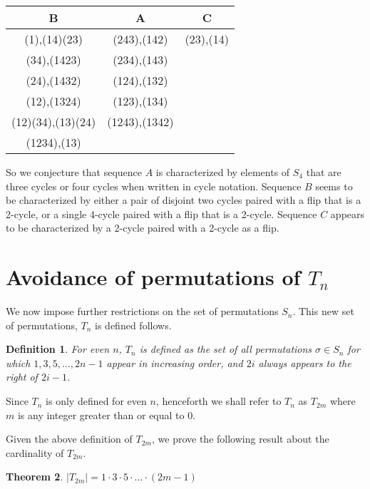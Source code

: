 \documentclass[11pt,letterpaper,twoside,english]{article}
\theoremstyle{theorem}
\newtheorem{theorem}{Theorem}
\newtheorem{definition}[theorem]{Definition}
\theoremstyle{remark}
\begin{document}
\begin{center}
\begin{tabular}{|c|c|c|}
B &A&C\\
\hline
(1),(14)(23)&(243),(142)&(23),(14)\\
(34),(1423)&(234),(143)&\\
(24),(1432)&(124),(132)&\\
(12),(1324)&(123),(134)&\\
(12)(34),(13)(24)&(1243),(1342)&\\
(1234),(13)&&\\
\end{tabular}
\end{center}

So we conjecture that sequence $A$ is characterized by elements of $S_4$ that are three cycles or four cycles when written in cycle notation. Sequence $B$ seems to be characterized by either a pair of disjoint two cycles paired with a flip that is a 2-cycle, or a single 4-cycle paired with a flip that is a 2-cycle. Sequence $C$ appears to be characterized by a 2-cycle paired with a 2-cycle as a flip. 


\section{Avoidance of permutations of $T_n$}
\label{Tn}
We now impose further restrictions on the set of permutations $S_n$. This new set of permutations, $T_n$ is defined follows.

\begin{definition}
For even $n$, $T_n$ is defined as the set of all permutations $\sigma \in S_n$ for which $1,3,5,\ldots,2n-1$ appear in increasing order, and $2i$ always appears to the right of $2i-1$.
\end{definition}

Since $T_n$ is only defined for even $n$, henceforth we shall refer to $T_n$ as $T_{2m}$ where $m$ is any integer greater than or equal to $0$.

Given the above definition of $T_{2m}$, we prove the following result about the cardinality of $T_{2m}$.

\begin{theorem}
$|T_{2m}| = 1 \cdot 3 \cdot 5 \cdot \ldots \cdot (2m-1)$
\end{theorem}
\end{document}
